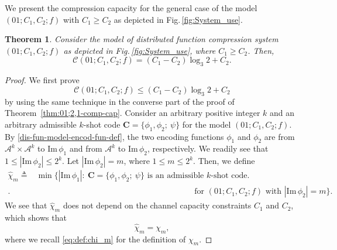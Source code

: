 \documentclass[11pt,draftclsnofoot,onecolumn]{IEEEtran}
\newtheorem{theorem}{Theorem}
\newcommand{\mbC}{\mathbf{C}}
\def\Im{\mathrm{Im}}
\begin{document}
{We present the compression capacity for the general case of the model $(01;C_1,C_2;f)$ with $C_1\geq C_2$ as depicted in Fig.\,\ref{fig:System_use}.

\begin{theorem}\label{C1-C2-net-model-cap}
Consider the model of distributed function compression system $(01;C_1,C_2;f)$ as depicted in Fig.\,\ref{fig:System_use}, where $C_1\geq C_2$.
Then,
\begin{equation*}
\mathcal{C}(01;C_1,C_2;f)=(C_1-C_2)\log_{3}2+C_2.
\end{equation*}
\end{theorem}

\begin{proof}
We first prove
\begin{equation}
\mathcal{C}(01;C_1,C_2;f)\leq(C_1-C_2)\log_{3}2+C_2\label{C1-C2_cap_upp_bound}
\end{equation}
by using the same technique in the converse part of the proof of Theorem~\ref{thm:01;2,1-comp-cap}.
Consider an arbitrary positive integer $k$ and an arbitrary admissible $k$-shot code $\mbC=\big\{\phi_{1}, \phi_2;~\psi\big\}$ for the model $(01;C_1,C_2;f)$. By \eqref{dis-fun-model-encod-fun-def}, the
two encoding functions $\phi_1$ and $\phi_2$ are from $\mathcal{A}^k\times\mathcal{A}^k$ to $\Im\,\phi_1$ and  from $\mathcal{A}^k$ to $\Im\,\phi_2$, respectively. We readily see that $1\leq|\Im\,\phi_2|\leq 2^k$. Let $|\Im\,\phi_2|=m$, where $1\leq m\leq 2^k$. Then, we define
\begin{equation}
\begin{aligned}
\widehat{\chi}_{m}\triangleq&\min\big\{|\Im\,\phi_1|:~\text{$\mbC=\big\{\phi_{1},\phi_2;~\psi\big\}
$ is an admissible $k$-shot  code} \big.\\\big.&\qquad\quad\qquad\quad\quad\quad\quad\qquad\quad\qquad\quad\qquad\quad
\;\;\;\,\text{ for $(01;C_1,C_2;f)$  with $|\Im\,\phi_{2}|=m$}\big\}.\label{eq:def:hat-chi_m}
\end{aligned}
\end{equation}
We see that $\widehat{\chi}_m$ does not depend on the channel capacity constraints  $C_1$
and $C_2$, which shows that
\begin{equation}
\widehat{\chi}_m=\chi_m,\label{rel-hat-chi_m-chi_m}
\end{equation}
where we recall \eqref{eq:def:chi_m} for the definition of $\chi_m$.


\end{proof}}
\end{document}
